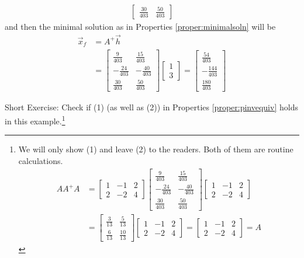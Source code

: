 \begin{solution}
\begin{align*}
\begin{bmatrix}
\frac{30}{403} & \frac{50}{403}
\end{bmatrix}
\end{align*}
and then the minimal solution as in Properties \ref{proper:minimalsoln} will be
\begin{align*}
\vec{x}_f &= A^+\vec{h} \\
&= \begin{bmatrix}
\frac{9}{403} & \frac{15}{403}\\ 
-\frac{24}{403} & -\frac{40}{403}\\ 
\frac{30}{403} & \frac{50}{403}
\end{bmatrix}
\begin{bmatrix}
1 \\
3
\end{bmatrix} =
\begin{bmatrix}
\frac{54}{403}\\ 
-\frac{144}{403}\\ 
\frac{180}{403}
\end{bmatrix}
\end{align*}
\end{solution}
Short Exercise: Check if (1) (as well as (2)) in Properties \ref{proper:pinvequiv} holds in this example.\footnote{We will only show (1) and leave (2) to the readers. Both of them are routine calculations.
\begin{align*}
AA^+A &= \begin{bmatrix}
1 & -1 & 2 \\
2 & -2 & 4
\end{bmatrix} 
\begin{bmatrix}
\frac{9}{403} & \frac{15}{403}\\ 
-\frac{24}{403} & -\frac{40}{403}\\ 
\frac{30}{403} & \frac{50}{403}
\end{bmatrix}
\begin{bmatrix}
1 & -1 & 2 \\
2 & -2 & 4
\end{bmatrix} \\
&=
\begin{bmatrix}
\frac{3}{13}&\frac{5}{13}\\ 
\frac{6}{13}&\frac{10}{13}
\end{bmatrix}
\begin{bmatrix}
1 & -1 & 2 \\
2 & -2 & 4
\end{bmatrix}
= 
\begin{bmatrix}
1 & -1 & 2 \\
2 & -2 & 4
\end{bmatrix}
= A
\end{align*}
}

